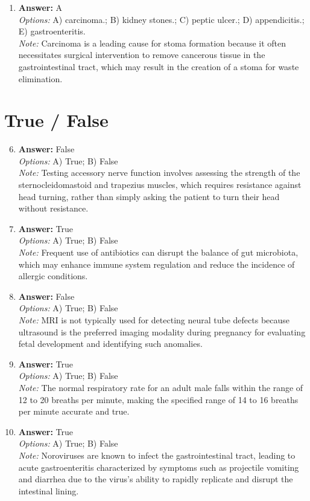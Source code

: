\documentclass[12pt]{article}
\begin{document}
\begin{enumerate}[label=\arabic*.]
\\ \textit{Note:} The correct answer is "Primates" because both Lassa and Ebola viruses are zoonotic pathogens that have been linked to specific primate species, highlighting the role of wildlife, particularly primates, in the emergence and transmission of these viruses in West Africa.
\item \textbf{Answer:} A
\\ \textit{Options:} A) carcinoma.; B) kidney stones.; C) peptic ulcer.; D) appendicitis.; E) gastroenteritis.
\\ \textit{Note:} Carcinoma is a leading cause for stoma formation because it often necessitates surgical intervention to remove cancerous tissue in the gastrointestinal tract, which may result in the creation of a stoma for waste elimination.
\end{enumerate}

\section*{True / False}
\begin{enumerate}[label=\arabic*.]
\setcounter{enumi}{5}
\item \textbf{Answer:} False
\\ \textit{Options:} A) True; B) False
\\ \textit{Note:} Testing accessory nerve function involves assessing the strength of the sternocleidomastoid and trapezius muscles, which requires resistance against head turning, rather than simply asking the patient to turn their head without resistance.
\item \textbf{Answer:} True
\\ \textit{Options:} A) True; B) False
\\ \textit{Note:} Frequent use of antibiotics can disrupt the balance of gut microbiota, which may enhance immune system regulation and reduce the incidence of allergic conditions.
\item \textbf{Answer:} False
\\ \textit{Options:} A) True; B) False
\\ \textit{Note:} MRI is not typically used for detecting neural tube defects because ultrasound is the preferred imaging modality during pregnancy for evaluating fetal development and identifying such anomalies.
\item \textbf{Answer:} True
\\ \textit{Options:} A) True; B) False
\\ \textit{Note:} The normal respiratory rate for an adult male falls within the range of 12 to 20 breaths per minute, making the specified range of 14 to 16 breaths per minute accurate and true.
\item \textbf{Answer:} True
\\ \textit{Options:} A) True; B) False
\\ \textit{Note:} Noroviruses are known to infect the gastrointestinal tract, leading to acute gastroenteritis characterized by symptoms such as projectile vomiting and diarrhea due to the virus's ability to rapidly replicate and disrupt the intestinal lining.
\end{enumerate}
\end{document}
